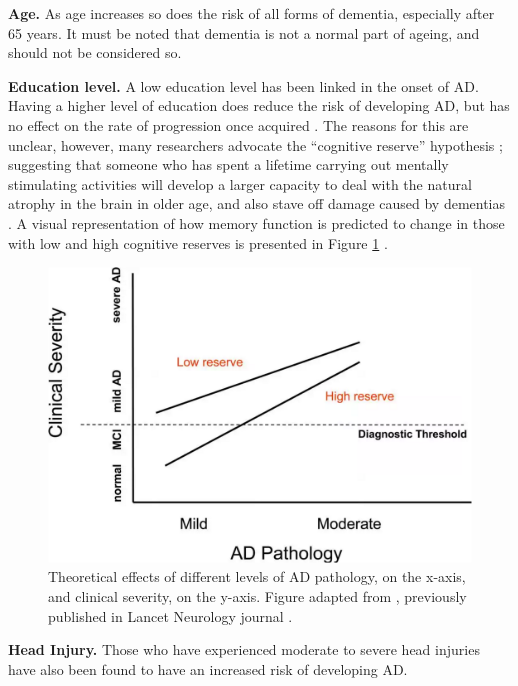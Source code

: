 \textbf{Age.}
As age increases so does the risk of all forms of dementia, especially after 65 years. It must be noted that dementia is not a normal part of ageing, and should not be considered so.

\textbf{Education level.}
A low education level has been linked in the onset of AD. Having a higher level of education does reduce the risk of developing AD, but has no effect on the rate of progression once acquired \cite{Wilson2009}.
The reasons for this are unclear, however, many researchers advocate the ``cognitive reserve'' hypothesis \cite{Stern2012}; suggesting that someone who has spent a lifetime carrying out mentally stimulating activities will develop a larger capacity to deal with the natural atrophy in the brain in older age, and also stave off damage caused by dementias \cite{Norman2007, AlzheimerEurope2015}. A visual representation of how memory function is predicted to change in those with low and high cognitive reserves is presented in Figure \ref{fig: lancet-neurology-adpathology} \cite{Stern2012}.

\begin{figure}[h]
    \centering
    \includegraphics[scale=0.1, angle=0]{Files/literature-review/figures/lancet-neurology-adpathology}
    \caption{Theoretical effects of different levels of AD pathology, on the x-axis, and clinical severity, on the y-axis. Figure adapted from \citeauthor{Stern2012} \citeyear{Stern2012}, previously published in Lancet Neurology journal \cite{Stern2012}.}
    \label{fig: lancet-neurology-adpathology}
\end{figure}


\textbf{Head Injury.}
Those who have experienced moderate to severe head injuries have also been found to have an increased risk of developing AD.

